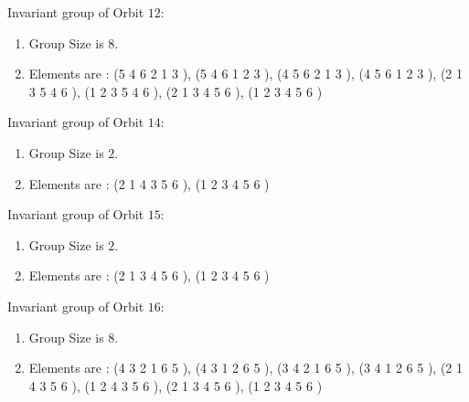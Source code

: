 \documentclass[12pt]{article}
\begin{document}
Invariant group of Orbit $12$:
\begin{enumerate}
\item Group Size is $8$.
\item Elements are : (5 4 6 2 1 3  ), (5 4 6 1 2 3  ), (4 5 6 2 1 3  ), (4 5 6 1 2 3  ), (2 1 3 5 4 6  ), (1 2 3 5 4 6  ), (2 1 3 4 5 6  ), (1 2 3 4 5 6  )
\end{enumerate}
Invariant group of Orbit $14$:
\begin{enumerate}
\item Group Size is $2$.
\item Elements are : (2 1 4 3 5 6  ), (1 2 3 4 5 6  )
\end{enumerate}
Invariant group of Orbit $15$:
\begin{enumerate}
\item Group Size is $2$.
\item Elements are : (2 1 3 4 5 6  ), (1 2 3 4 5 6  )
\end{enumerate}
Invariant group of Orbit $16$:
\begin{enumerate}
\item Group Size is $8$.
\item Elements are : (4 3 2 1 6 5  ), (4 3 1 2 6 5  ), (3 4 2 1 6 5  ), (3 4 1 2 6 5  ), (2 1 4 3 5 6  ), (1 2 4 3 5 6  ), (2 1 3 4 5 6  ), (1 2 3 4 5 6  )
\end{enumerate}
\end{document}
